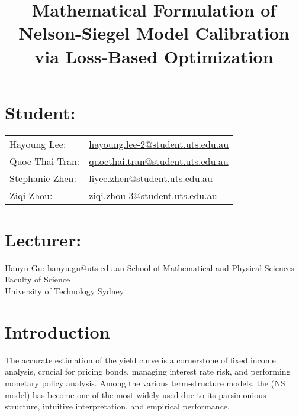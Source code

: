 \documentclass[12pt]{article}
\begin{document}
\title{Mathematical Formulation of Nelson-Siegel Model Calibration via Loss-Based Optimization}
\maketitle



\begin{center}
\section*{Student:}
\begin{tabular}{@{}ll@{}}
Hayoung Lee:   & \href{mailto:hayoung.lee-2@student.uts.edu.au}{hayoung.lee-2@student.uts.edu.au} \\ 
Quoc Thai Tran:& \href{mailto:quocthai.tran@student.uts.edu.au}{quocthai.tran@student.uts.edu.au} \\ 
Stephanie Zhen:& \href{mailto:liyee.zhen@student.uts.edu.au}{liyee.zhen@student.uts.edu.au}\\ 
Ziqi Zhou:     & \href{mailto:ziqi.zhou-3@student.uts.edu.au}{ziqi.zhou-3@student.uts.edu.au} 
\end{tabular}

\section*{Lecturer:}
Hanyu Gu: \href{mailto:hanyu.gu@uts.edu.au}{hanyu.gu@uts.edu.au}
\vfill
\large
School of Mathematical and Physical Sciences\\
Faculty of Science\\
University of Technology Sydney\\

\end{center}
\clearpage
\tableofcontents

\vspace{1cm}
\clearpage
\section{Introduction}

The accurate estimation of the yield curve is a cornerstone of fixed income analysis, crucial for pricing bonds, managing interest rate risk, and performing monetary policy analysis. Among the various term‑structure models, the \cite{NelsonSiegel1987} (NS model) has become one of the most widely used due to its parsimonious structure, intuitive interpretation, and empirical performance.
\end{document}
